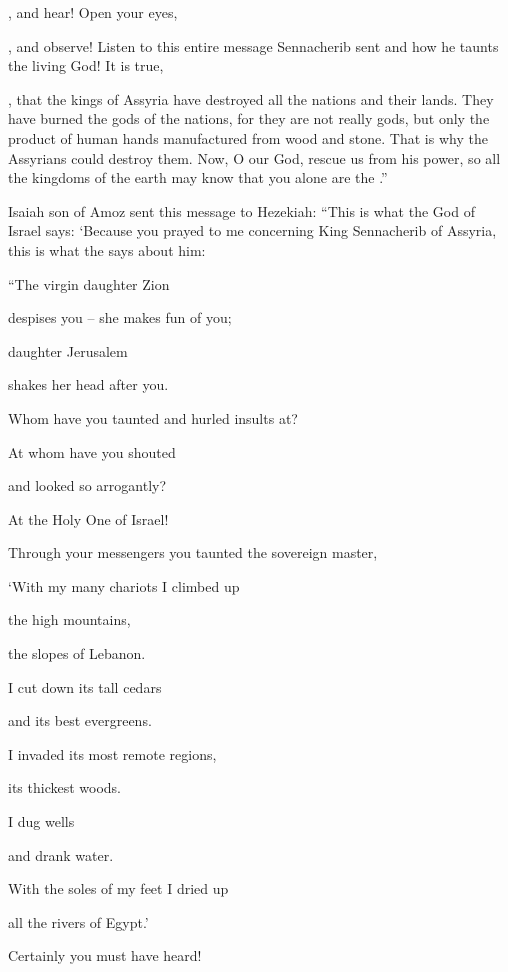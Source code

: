 {{}, and hear! Open
your eyes,

{}, and observe! Listen
to this
entire
message
Sennacherib
sent
and how he taunts
the living
God!
It is true,

{}, that the kings
of Assyria
have destroyed
all
the nations
and their lands.
They
have burned
the gods
of the nations,
for
they
are not
really gods,
but only
the product
of human
hands
manufactured from wood
and stone.
That
is why the Assyrians could destroy
them.
Now,
O
{}
our God,
rescue
us from his power,
so all
the kingdoms
of the earth
may know
that
you
alone
are the
{}.”
\par }{\PP {}Isaiah
son
of Amoz
sent
this message to
Hezekiah: “This is what
the {}
God
of Israel
says: ‘Because
you prayed
to me
concerning King
Sennacherib
of Assyria,
this
is what
the {}
says
about him:

\par }{\Q “The virgin
daughter
Zion
\par }{\Q despises you – she makes fun of you;
\par }{\Q daughter Jerusalem
\par }{\Q shakes her head after you.
\par }{\Q {}Whom
have you taunted
and hurled insults
at?
\par }{\Q At whom
have you shouted
\par }{\Q and looked
so arrogantly?

\par }{\Q At the Holy One
of Israel!
\par }{\Q {}Through
your messengers
you taunted
the sovereign master,
\par }{\Q ‘With my many
chariots
I
climbed up
\par }{\Q the high
mountains,
\par }{\Q the slopes
of Lebanon.
\par }{\Q I cut down
its tall
cedars
\par }{\Q and its best
evergreens.
\par }{\Q I invaded
its most remote regions,
\par }{\Q its thickest
woods.
\par }{\Q {}I
dug wells
\par }{\Q and drank
water.
\par }{\Q With the soles
of my feet I dried up
\par }{\Q all
the rivers
of Egypt.’
\par }{\Q Certainly
you must have heard!

}
